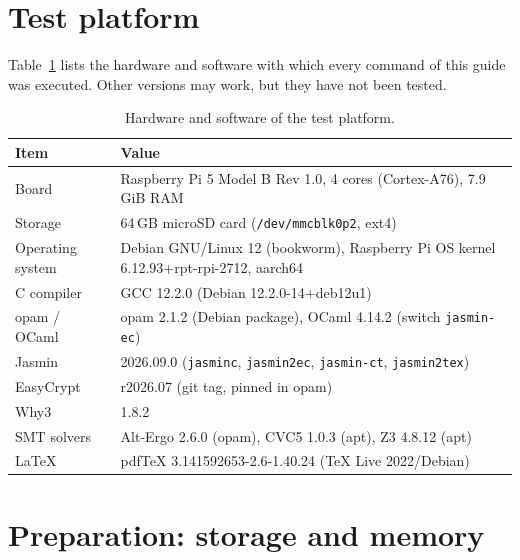 \documentclass[11pt,a4paper]{article}
\newcommand{\file}[1]{\texttt{#1}}
\begin{document}
\section{Test platform}

Table~\ref{tab:platform} lists the hardware and software with which every
command of this guide was executed. Other versions may work, but they have
not been tested.

\begin{table}[h]
\centering
\begin{tabularx}{0.9\textwidth}{@{}lX@{}}
\toprule
\textbf{Item} & \textbf{Value} \\
\midrule
Board            & Raspberry Pi 5 Model B Rev 1.0, 4 cores (Cortex-A76), 7.9\,GiB RAM \\
Storage          & 64\,GB microSD card (\file{/dev/mmcblk0p2}, ext4) \\
Operating system & Debian GNU/Linux 12 (bookworm), Raspberry Pi OS kernel 6.12.93+rpt-rpi-2712, aarch64 \\
C compiler       & GCC 12.2.0 (Debian 12.2.0-14+deb12u1) \\
opam / OCaml     & opam 2.1.2 (Debian package), OCaml 4.14.2 (switch \texttt{jasmin-ec}) \\
Jasmin           & 2026.09.0 (\texttt{jasminc}, \texttt{jasmin2ec}, \texttt{jasmin-ct}, \texttt{jasmin2tex}) \\
EasyCrypt        & r2026.07 (git tag, pinned in opam) \\
Why3             & 1.8.2 \\
SMT solvers      & Alt-Ergo 2.6.0 (opam), CVC5 1.0.3 (apt), Z3 4.8.12 (apt) \\
\LaTeX           & pdfTeX 3.141592653-2.6-1.40.24 (TeX Live 2022/Debian) \\
\bottomrule
\end{tabularx}
\caption{Hardware and software of the test platform.}
\label{tab:platform}
\end{table}

\section{Preparation: storage and memory}
\label{sec:prep}
\end{document}
